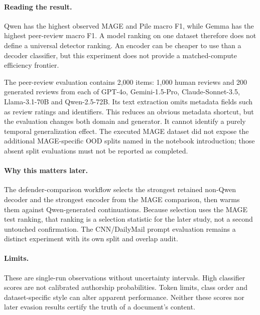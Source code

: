 \paragraph{Reading the result.} Qwen has the highest observed MAGE and Pile macro F1, while Gemma has the highest peer-review macro F1. A model ranking on one dataset therefore does not define a universal detector ranking. An encoder can be cheaper to use than a decoder classifier, but this experiment does not provide a matched-compute efficiency frontier.

The peer-review evaluation contains 2,000 items: 1,000 human reviews and 200 generated reviews from each of GPT-4o, Gemini-1.5-Pro, Claude-Sonnet-3.5, Llama-3.1-70B and Qwen-2.5-72B. Its text extraction omits metadata fields such as review ratings and identifiers. This reduces an obvious metadata shortcut, but the evaluation changes both domain and generator. It cannot identify a purely temporal generalization effect. The executed MAGE dataset did not expose the additional MAGE-specific OOD splits named in the notebook introduction; those absent split evaluations must not be reported as completed.

\paragraph{Why this matters later.} The defender-comparison workflow selects the strongest retained non-Qwen decoder and the strongest encoder from the MAGE comparison, then warms them against Qwen-generated continuations. Because selection uses the MAGE test ranking, that ranking is a selection statistic for the later study, not a second untouched confirmation. The CNN/DailyMail prompt evaluation remains a distinct experiment with its own split and overlap audit.

\paragraph{Limits.} These are single-run observations without uncertainty intervals. High classifier scores are not calibrated authorship probabilities. Token limits, class order and dataset-specific style can alter apparent performance. Neither these scores nor later evasion results certify the truth of a document's content.
